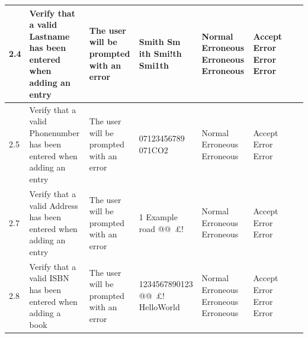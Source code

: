 \begin{landscape}
\begin{center}
\begin{longtable}{|p{1.5cm}|p{2cm}|p{2.5cm}|p{2.5cm}|p{2cm}|p{2cm}|p{2cm}|p{2cm}|}
        2.4 & Verify that a valid Lastname has been entered when adding an entry & The user will be prompted with an error & Smith \newline Sm ith \newline Smi!th \newline Smi1th & Normal \newline Erroneous \newline Erroneous \newline Erroneous & Accept \newline Error \newline Error \newline Error & & \\ \hline
        2.5 & Verify that a valid Phonenumber has been entered when adding an entry & The user will be prompted with an error & 07123456789 \newline 07123123.3 \newline 071CO2 & Normal \newline Erroneous \newline Erroneous & Accept \newline Error \newline Error & & \\ \hline
        2.7 & Verify that a valid Address has been entered when adding an entry & The user will be prompted with an error & 1 Example road \newline @@~£! \newline 1231231 & Normal \newline Erroneous \newline Erroneous & Accept \newline Error \newline Error & & \\ \hline
        2.8 & Verify that a valid ISBN has been entered when adding a book & The user will be prompted with an error & 1234567890123 \newline @@~£! \newline 123 \newline HelloWorld & Normal \newline Erroneous \newline Erroneous \newline Erroneous & Accept \newline Error \newline Error \newline Error & & \\ \hline

\end{longtable}
\end{center}
\end{landscape}

